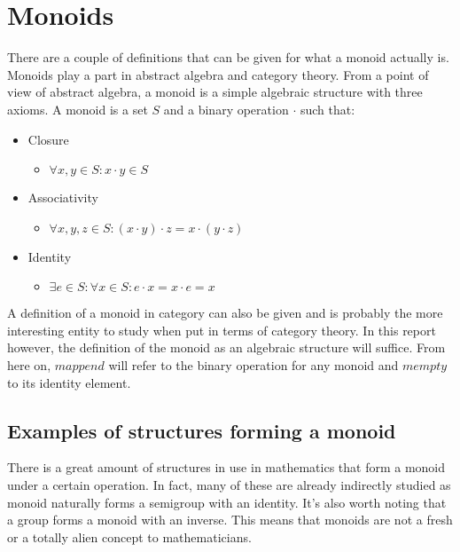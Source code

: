 \documentclass{acm_proc_article-sp}
\begin{document}
\section{Monoids}
There are a couple of definitions that can be given for what a monoid
actually is. Monoids play a part in abstract algebra and category
theory. From a point of view of abstract algebra, a monoid is a simple
algebraic structure with three axioms. A monoid is a set $S$ and a
binary operation $\cdot$ such that:
\begin{itemize}
\item Closure
  \begin{itemize}
  \item $\forall x,y \in S: x \cdot y \in S$
  \end{itemize}
\item Associativity
  \begin{itemize}
  \item $\forall x,y,z \in S: (x \cdot y) \cdot z = x \cdot (y
    \cdot z)$
  \end{itemize}
\item Identity
  \begin{itemize}
  \item $\exists e \in S: \forall x \in S: e \cdot x = x \cdot e
    = x$
  \end{itemize}
\end{itemize}
A definition of a monoid in category can also be given and is
probably the more interesting entity to study when put in terms of
category theory. In this report however, the definition of the monoid
as an algebraic structure will suffice. From here on, $mappend$ will
refer to the binary operation for any monoid and $mempty$ to its
identity element.
\subsection{Examples of structures forming a monoid}
There is a great amount of structures in use in mathematics that form
a monoid under a certain operation. In fact, many of these are already
indirectly studied as monoid naturally forms a semigroup with an
identity. It's also worth noting that a group forms a monoid with an
inverse. This means that monoids are not a fresh or a totally alien
concept to mathematicians.
\end{document}
